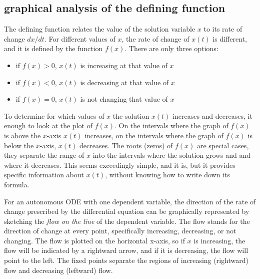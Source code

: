 \documentclass[
  letterpaper,
  DIV=11,
  numbers=noendperiod]{scrreprt}
\begin{document}
\hypertarget{graphical-analysis-of-the-defining-function}{%
\subsection{graphical analysis of the defining
function}\label{graphical-analysis-of-the-defining-function}}

The defining function relates the value of the solution variable \(x\)
to its rate of change \(dx/dt\). For different values of \(x\), the rate
of change of \(x(t)\) is different, and it is defined by the function
\(f(x)\). There are only three options:

\begin{itemize}
\item
  if \(f(x) > 0\), \(x(t)\) is increasing at that value of \(x\)
\item
  if \(f(x) < 0\), \(x(t)\) is decreasing at that value of \(x\)
\item
  if \(f(x) = 0\), \(x(t)\) is not changing that value of \(x\)
\end{itemize}

To determine for which values of \(x\) the solution \(x(t)\) increases
and decreases, it enough to look at the plot of \(f(x)\). On the
intervals where the graph of \(f(x)\) is above the \(x\)-axis \(x(t)\)
increases, on the intervals where the graph of \(f(x)\) is below the
\(x\)-axis, \(x(t)\) decreases. The roots (zeros) of \(f(x)\) are
special cases, they separate the range of \(x\) into the intervals where
the solution grows and and where it decreases. This seems exceedingly
simple, and it is, but it provides specific information about \(x(t)\),
without knowing how to write down its formula.

For an autonomous ODE with one dependent variable, the direction of the
rate of change prescribed by the differential equation can be
graphically represented by sketching the
 \emph{flow on the line} of the
dependent variable. The flow stands for the direction of change at every
point, specifically increasing, decreasing, or not changing. The flow is
plotted on the horizontal x-axis, so if \(x\) is increasing, the flow
will be indicated by a rightward arrow, and if it is decreasing, the
flow will point to the left. The fixed points separate the regions of
increasing (rightward) flow and decreasing (leftward) flow.
\end{document}
